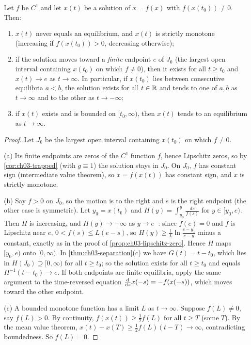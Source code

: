 \begin{theorem}\label{thm:ch07-structure}
Let $f$ be $C^1$ and let $x(t)$ be a solution of $\dot x = f(x)$ with
$f(x(t_0))\neq0$. Then:
\begin{enumerate}[label=(\alph*)]
  \item $x(t)$ never equals an equilibrium, and $x(t)$ is strictly monotone (increasing if $f(x(t_0))>0$, decreasing otherwise);
  \item if the solution moves toward a \emph{finite} endpoint $e$ of $J_0$ (the
        largest open interval containing $x(t_0)$ on which $f\neq0$), then it
        exists for all $t\ge t_0$ and $x(t)\to e$ as $t\to\infty$. In particular,
        if $x(t_0)$ lies between consecutive equilibria $a<b$, the solution
        exists for all $t\in\mathbb{R}$ and tends to one of $a,b$ as $t\to\infty$ and to
        the other as $t\to-\infty$;
  \item if $x(t)$ exists and is bounded on $[t_0,\infty)$, then $x(t)$ tends to an
        equilibrium as $t\to\infty$.
\end{enumerate}
\end{theorem}

\begin{proof}
Let $J_0$ be the largest open interval containing $x(t_0)$ on which $f\neq0$.

(a) Its finite endpoints are zeros of the $C^1$ function $f$, hence Lipschitz
zeros, so by \cref{cor:ch03-trapped} (with $g\equiv1$) the solution stays in
$J_0$. On $J_0$, $f$ has constant sign (intermediate value theorem), so
$\dot x = f(x(t))$ has constant sign, and $x$ is strictly monotone.

(b) Say $f>0$ on $J_0$, so the motion is to the right and $e$ is the right
endpoint (the other case is symmetric). Let $y_0 = x(t_0)$ and
$H(y) = \int_{y_0}^{y}\frac{\mathrm{d}s}{f(s)}$ for $y\in[y_0,e)$. Then $H$ is
increasing, and $H(y)\to+\infty$ as $y\to e^-$: since $f(e) = 0$ and $f$ is
Lipschitz near $e$, $0<f(s)\le L(e - s)$, so
$H(y)\ge\frac1L\ln\frac{e - y_1}{e - y}$ minus a constant, exactly as in the
proof of \cref{prop:ch03-lipschitz-zero}. Hence $H$ maps $[y_0,e)$ onto
$[0,\infty)$. In \cref{thm:ch03-separation}(c) we have $G(t) = t - t_0$, which
lies in $H(J_0)\supseteq[0,\infty)$ for all $t\ge t_0$; so the solution exists
for all $t\ge t_0$ and equals $H^{-1}(t - t_0)\to e$. If both endpoints are
finite equilibria, apply the same argument to the time-reversed equation
$\frac{\mathrm{d}}{\mathrm{d}s}x(-s) = -f(x(-s))$, which moves toward the other endpoint.

(c) A bounded monotone function has a limit $L$ as $t\to\infty$. Suppose
$f(L)\neq0$, say $f(L)>0$. By continuity, $f(x(t))\ge \frac12 f(L)$ for all
$t\ge T$ (some $T$). By the mean value theorem,
$x(t) - x(T)\ge\frac12f(L)(t - T)\to\infty$, contradicting boundedness. So
$f(L) = 0$.
\end{proof}

